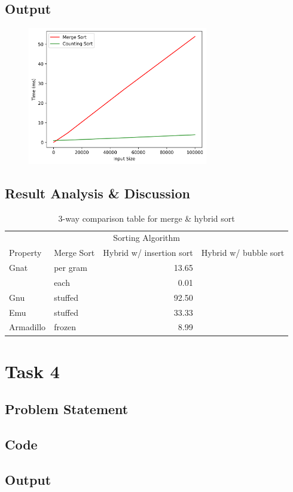 \subsection{Output}
\begin{figure}[H]
    \centering
    \includegraphics[width=0.7\textwidth]{task1_merge_count.png}
\end{figure}
\subsection{Result Analysis \& Discussion}

\begin{table}[H]
    \centering
    \caption{3-way comparison table for merge \& hybrid sort}
    \label{tab:comp}
\begin{tabular}{llrr}
    \toprule
    \multicolumn{4}{c}{Sorting Algorithm} \\
    \cmidrule(r){2-4}
    Property & Merge Sort & Hybrid w/ insertion sort & Hybrid w/ bubble sort \\
    \midrule
    Gnat & per gram & 13.65 \\
    & each & 0.01 \\
    Gnu & stuffed & 92.50 \\
    Emu & stuffed & 33.33 \\
    Armadillo & frozen & 8.99 \\
    \bottomrule
\end{tabular}
\end{table}

\section{Task 4}
\subsection{Problem Statement}

\subsection{Code}
\begin{code}
    
\end{code}

\subsection{Output}
